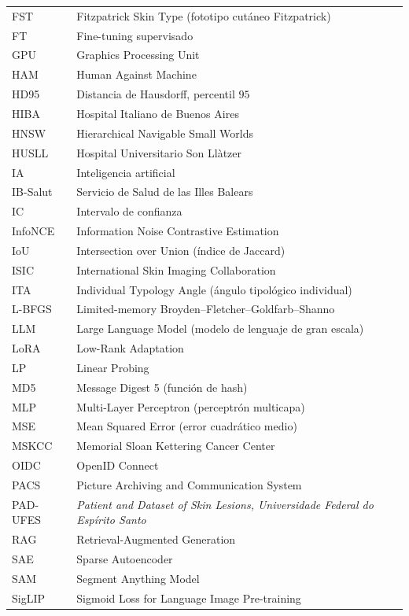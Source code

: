 \begin{tabular}{p{}p{}}
FST & Fitzpatrick Skin Type (fototipo cutáneo Fitzpatrick) \\
FT & Fine-tuning supervisado \\
GPU & Graphics Processing Unit \\
HAM & Human Against Machine \\
HD95 & Distancia de Hausdorff, percentil $95$ \\
HIBA & Hospital Italiano de Buenos Aires \\
HNSW & Hierarchical Navigable Small Worlds \\
HUSLL & Hospital Universitario Son Llàtzer \\
IA & Inteligencia artificial \\
IB-Salut & Servicio de Salud de las Illes Balears \\
IC & Intervalo de confianza \\
InfoNCE & Information Noise Contrastive Estimation \\
IoU & Intersection over Union (índice de Jaccard) \\
ISIC & International Skin Imaging Collaboration \\
ITA & Individual Typology Angle (ángulo tipológico individual) \\
L-BFGS & Limited-memory Broyden--Fletcher--Goldfarb--Shanno \\
LLM & Large Language Model (modelo de lenguaje de gran escala) \\
LoRA & Low-Rank Adaptation \\
LP & Linear Probing \\
MD5 & Message Digest 5 (función de hash) \\
MLP & Multi-Layer Perceptron (perceptrón multicapa) \\
MSE & Mean Squared Error (error cuadrático medio) \\
MSKCC & Memorial Sloan Kettering Cancer Center \\
OIDC & OpenID Connect \\
PACS & Picture Archiving and Communication System \\
PAD-UFES & \emph{Patient and Dataset of Skin Lesions, Universidade Federal do Espírito Santo} \\
RAG & Retrieval-Augmented Generation \\
SAE & Sparse Autoencoder \\
SAM & Segment Anything Model \\
SigLIP & Sigmoid Loss for Language Image Pre-training \\

\end{tabular}
